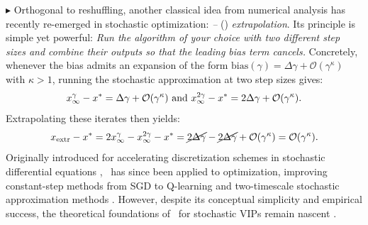 $\blacktriangleright$ Orthogonal to reshuffling, another classical idea from numerical analysis has recently re-emerged in stochastic optimization: \emph{\citeauthor{richardson1911ix}–\citeauthor{romberg1955vereinfachte}} (\RRrom) \emph{extrapolation}. Its principle is simple yet powerful: \emph{Run the algorithm of your choice with two different step sizes and combine their outputs so that the leading bias term cancels.} Concretely, whenever the bias admits an expansion of the form $\text{bias}(\gamma) = \Delta \gamma + \mathcal{O}(\gamma^{\kappa})$ with $\kappa>1$, running the stochastic approximation at two step sizes gives:
\vspace{-0.25em}\[\text{$x_{\infty}^{\gamma} - x^* = \Delta \gamma + \mathcal{O}(\gamma^{\kappa})$ and $x_{\infty}^{2\gamma} - x^* = 2\Delta \gamma + \mathcal{O}(\gamma^{\kappa})$.}\vspace{-0.25em}\] 
Extrapolating these iterates then yields: \vspace{-0.25em} 
\[
x_{\text{extr}}- x^*
= 2x_{\infty}^{\gamma} - x_{\infty}^{2\gamma} - x^*
= \cancel{2\Delta \gamma} - \cancel{2\Delta \gamma} + \mathcal{O}(\gamma^{\kappa})
= \mathcal{O}(\gamma^{\kappa}). \vspace{-0.25em}
\]
Originally introduced for accelerating discretization schemes in stochastic differential equations \citep{hildebrand1987introduction,talay1990expansion,bally1996law}, \RRrom\ has since been applied to optimization, improving constant-step methods from SGD \citep{durmus2016stochastic,dieuleveut2020bridging,mangold2024refined,sheshukova2024nonasymptotic} to Q-learning and two-timescale stochastic approximation methods \citep{huo2023bias,kwon2024two,zhang2024constant,allmeier2024computing}. 
However, despite its conceptual simplicity and empirical success, the theoretical foundations of \RRrom\ for stochastic VIPs remain nascent \citep{vlatakis2024stochastic}. 


